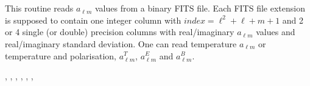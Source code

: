 
\sloppy


 \section[fits2alms*]{ }
\label{sub:fits2alms}
\author{Frode K.~Hansen, Eric Hivon}

\begin{facility}
{This routine reads  $a_{\ell m}$  values from a binary FITS file. Each FITS file
  extension is supposed to contain one integer column with
  $index=\ell^2+\ell+m+1$  and 2 or 4 single (or double) precision columns 
with real/imaginary  $a_{\ell m}$  values and real/imaginary   standard deviation. 
One can read temperature $a_{\ell m}$ or temperature and polarisation, $a^T_{\ell m}$, $a^E_{\ell m}$ and $a^B_{\ell m}$.}
{\modFitstools}
\end{facility}

\begin{f90format}
{%
, %
, %
, %
, %
, %
, %
}
\end{f90format}

